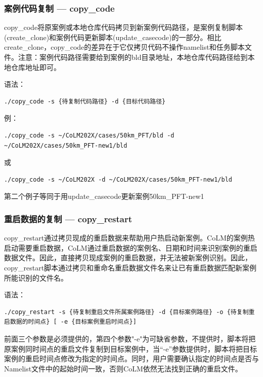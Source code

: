 \subsubsection{案例代码复制 --- copy\_code}
copy\_code将原案例或本地仓库代码拷贝到新案例代码路径，是案例复制脚本(create\_clone)和案例代码更新脚本(update\_casecode)的一部分。相比create\_clone，copy\_code的差异在于它仅拷贝代码不操作namelist和任务脚本文件。注意：案例代码路径需要给到案例的bld目录地址，本地仓库代码路径给到本地仓库地址即可。

语法：
\begin{lstlisting}[xleftmargin=2.5em]
./copy_code -s {待复制代码路径} -d {目标代码路径}
\end{lstlisting}

例：
\begin{lstlisting}[xleftmargin=2.5em]
./copy_code -s ~/CoLM202X/cases/50km_PFT/bld -d ~/CoLM202X/cases/50km_PFT-new1/bld
\end{lstlisting}
或
\begin{lstlisting}[xleftmargin=2.5em]
./copy_code -s ~/CoLM202X -d ~/CoLM202X/cases/50km_PFT-new1/bld
\end{lstlisting}
第二个例子等同于用update\_casecode更新案例50km\_PFT-new1

\subsubsection{重启数据的复制 --- copy\_restart}
copy\_restart通过拷贝现成的重启数据来帮助用户热启动新案例。CoLM的案例热启动需要重启数据，CoLM通过重启数据的案例名、日期和时间来识别案例的重启数据文件。因此，直接拷贝现成案例的重启数据，并无法被新案例识别。因此，copy\_restart脚本通过拷贝和重命名重启数据文件名来让已有重启数据匹配新案例所能识别的文件名。

语法：
\begin{lstlisting}[xleftmargin=2.5em]
./copy_restart -s {待复制重启文件所属案例路径} -d {目标案例路径} -o {待复制重启数据的时间点} [ -e {目标案例重启时间点}]
\end{lstlisting}

前面三个参数是必须提供的，第四个参数"-e"为可缺省参数，不提供时，脚本将把原案例同时间点的重启文件复制到目标案例中，当“-e”参数提供时，脚本将把目标案例的重启时间点修改为指定的时间点。同时，用户需要确认指定的时间点是否与Namelist文件中的起始时间一致，否则CoLM依然无法找到正确的重启文件。

